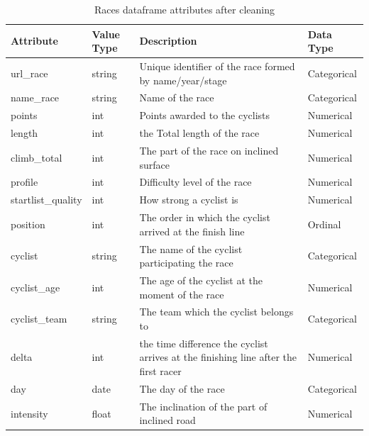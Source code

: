 \documentclass{article}
\begin{document}
\begin{table}[h!]
\centering
\begin{tabular}{|l|l|p{8cm}|l|}
\hline
\textbf{Attribute} & \textbf{Value Type} & \textbf{Description} & \textbf{Data Type} \\ \hline

url\_race & string & Unique identifier of the race formed by name/year/stage & Categorical \\ \hline
name\_race & string & Name of the race  & Categorical \\ \hline
points & int & Points awarded to the cyclists & Numerical \\ \hline
length & int & the Total length of the race & Numerical \\\hline
climb\_total & int & The part of the race on inclined surface & Numerical \\\hline
profile & int & Difficulty level of the race & Numerical \\\hline
startlist\_quality & int & How strong a cyclist is & Numerical \\\hline
position & int & The order in which the cyclist arrived at the finish line & Ordinal \\\hline
cyclist & string & The name of the cyclist participating the race & Categorical \\\hline
cyclist\_age & int & The age of the cyclist at the moment of the race & Numerical \\\hline
cyclist\_team & string & The team which the cyclist belongs to & Categorical \\\hline
delta & int & the time difference the cyclist arrives at the finishing line after the first racer & Numerical \\\hline
day & date & The day of the race & Categorical \\\hline
intensity & float & The inclination of the part of inclined road & Numerical \\\hline

\end{tabular}
\caption{Races dataframe attributes after cleaning}
\label{tab:example}
\end{table}
\end{document}
